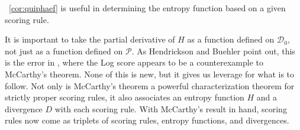 \documentclass[12pt]{article}
\begin{document}
{\Orollary}~\ref{cor:quiphaef} is useful in determining the entropy
function based on a given scoring rule. 

It is important to take the partial derivative of $H$ as a function
defined on $\mathcal{D}_{0}$, not just as a function defined on
$\mathcal{P}$. As Hendrickson and Buehler point out, this is the error
in , where the Log score appears to be a
counterexample to McCarthy's theorem. None of this is new, but it
gives us leverage for what is to follow. Not only is McCarthy's
theorem a powerful characterization theorem for strictly proper
scoring rules, it also associates an entropy function $H$ and a
divergence $D$ with each scoring rule. With McCarthy's result in hand,
scoring rules now come as triplets of scoring rules, entropy
functions, and divergences.

\end{document}

